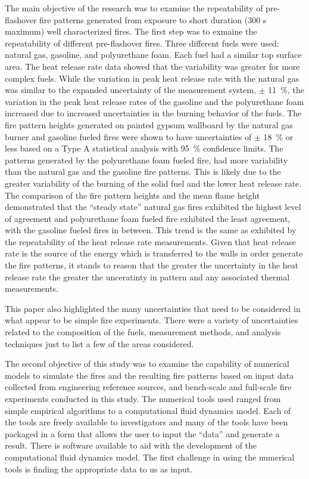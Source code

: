 \documentclass[twoside]{uocthesis}
\begin{document}
The main objective of the research was to examine the repeatability of pre-flashover fire patterns generated from exposure to short duration (300 s maximum) well characterized fires.  The first step was to exmaine the repeatability of different pre-flashover fires.  Three different fuels were used: natural gas, gasoline, and polyurethane foam.  Each fuel had a similar top surface area.  The heat release rate data showed that the variability was greater for more complex fuels.  While the variation in peak heat release rate with the natural gas was similar to the expanded uncertainty of the measurement system, $\pm$ 11~\%, the variation in the peak heat release rates of the gasoline and the polyurethane foam increased due to increased uncertainties in the burning behavior of the fuels.  The fire pattern heights generated on painted gypsum wallboard by the natural gas burner and gasoline fueled fires were shown to have uncertainties of $\pm$ 18~\% or less based on a Type A statistical analysis with 95~\% confidence limits. The patterns generated by the polyurethane foam fueled fire, had more variability than the natural gas and the gasoline fire patterns.  This is likely due to the greater variability of the burning of the solid fuel and the lower heat release rate.    The comparison of the fire pattern heights and the mean flame height demonstrated that the “steady state” natural gas fires exhibited the highest level of agreement and polyurethane foam fueled fire exhibited the least agreement, with the gasoline fueled fires in between.  This trend is the same as exhibited by the repeatability of the heat release rate measurements.  Given that heat release rate is the source of the energy which is transferred to the walls in order generate the fire patterns, it stands to reason that the greater the uncertainty in the heat release rate the greater the unceratinty in pattern and any associated thermal measurements.  

This paper also highlighted the many uncertainties that need to be considered in what appear to be simple fire experiments. There were a variety of uncertainties related to the composition of the fuels, measurement methods, and analysis techniques just to list a few of the areas considered. 

The second objective of this study was to examine the capability of numerical models to simulate the fires and the resulting fire patterns based on input data collected from engineering reference sources, and bench-scale and full-scale fire experiments conducted in this study.  The numerical tools used ranged from simple empirical algorithms to a computational fluid dynamics model.  Each of the tools are freely available to investigators and many of the tools have been packaged in a form that allows the user to input the ``data'' and generate a result.  There is software available to aid with the development of the computational fluid dynamics model.  The first challenge in using the numerical tools is finding the appropriate data to us as input.        




\end{document}
